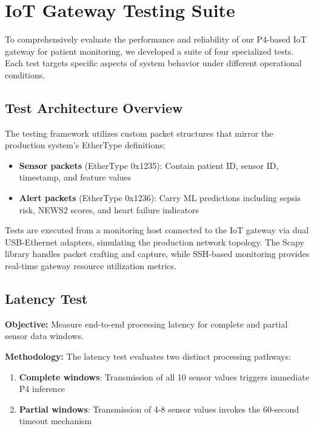 \section{IoT Gateway Testing Suite}
\label{sec:testing-suite}

To comprehensively evaluate the performance and reliability of our P4-based IoT gateway for patient monitoring, we developed a suite of four specialized tests. Each test targets specific aspects of system behavior under different operational conditions.

\subsection{Test Architecture Overview}
\label{subsec:test-architecture}

The testing framework utilizes custom packet structures that mirror the production system's EtherType definitions:
\begin{itemize}
    \item \textbf{Sensor packets} (EtherType 0x1235): Contain patient ID, sensor ID, timestamp, and feature values
    \item \textbf{Alert packets} (EtherType 0x1236): Carry ML predictions including sepsis risk, NEWS2 scores, and heart failure indicators
\end{itemize}

Tests are executed from a monitoring host connected to the IoT gateway via dual USB-Ethernet adapters, simulating the production network topology. The Scapy library handles packet crafting and capture, while SSH-based monitoring provides real-time gateway resource utilization metrics.

\subsection{Latency Test}
\label{subsec:latency-test}

\textbf{Objective:} Measure end-to-end processing latency for complete and partial sensor data windows.

\textbf{Methodology:} The latency test evaluates two distinct processing pathways:
\begin{enumerate}
    \item \textbf{Complete windows}: Transmission of all 10 sensor values triggers immediate P4 inference
    \item \textbf{Partial windows}: Transmission of 4-8 sensor values invokes the 60-second timeout mechanism
\end{enumerate}

